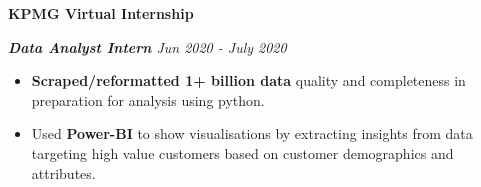 \textbf{KPMG \hfill Virtual Internship}\par

\textit{\textbf{Data Analyst Intern} \hfill {\faCalendar} Jun 2020 - July 2020} \par
\begin{itemize}
	\item \textbf{Scraped/reformatted 1+ billion data} quality and completeness in preparation for analysis using python.
	\item Used \textbf{Power-BI} to show visualisations by extracting insights from data targeting high value customers based on customer demographics and attributes.
\end{itemize}\vspace{0.1cm}\par